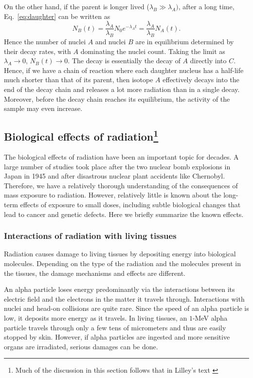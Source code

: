 \documentclass[nofootinbib,preprint,aps]{revtex4-1}
\begin{document}
        On the other hand, if the parent is longer lived
        ($\lambda_B \gg \lambda_A)$, after a long time, Eq.~\ref{eq:daughter} can be written as
        \begin{equation}
            N_B(t)=\frac{\lambda_A}{\lambda_B}N_0 e^{-\lambda_A t}=\frac{\lambda_A}{\lambda_B}N_A(t).
        \end{equation}
        Hence the number of nuclei $A$ and nuclei $B$ are in equilibrium determined by their decay rates, with
        $A$ dominating the nuclei count. Taking the limit as $\lambda_A \rightarrow 0$, $N_B(t)\rightarrow 0$.
        The decay is essentially the decay of $A$ directly into $C$. Hence, if we have a chain of reaction
        where each daughter nucleus has a half-life much shorter than that of its parent, then 
        isotope $A$ effectively decays into the end of the decay chain and releases a lot more radiation than
        in a single decay. Moreover, before the decay chain reaches its equilibrium, the activity of the sample
        may even increase.

        \subsection{Biological effects of radiation\footnote{Much of the discussion in this section follows that in
        Lilley's text \cite[chapt. 7]{l01}}}
        The biological effects of radiation have been an important topic for decades. A large
        number of studies took place after the two nuclear bomb explosions in Japan in 1945
        and after disastrous nuclear plant accidents like Chernobyl. Therefore, we have a relatively
        thorough understanding of the consequences of mass exposure to radiation. However, relatively
        little is known about the long-term effects of exposure to small doses, including subtle biological
        changes that lead to cancer and genetic defects. Here we briefly summarize the known effects.
        \subsubsection{Interactions of radiation with living tissues}
        \label{sec:interactions}
        Radiation causes damage to living tissues by depositing energy into biological molecules.
        Depending on the type of the radiation
        and the molecules present in the tissues, the damage mechanisms and effects are different.

        An alpha particle loses energy predominantly via the interactions between its electric
        field and the electrons in the matter it travels through. Interactions with nuclei and head-on collisions
        are quite rare. Since the speed of an alpha particle is low, it deposits more energy as it
        travels. In living tissues, an $1$-MeV alpha particle travels through only a few tens of micrometers and thus
        are easily stopped by skin. However, if alpha particles are ingested and more sensitive organs are irradiated,
        serious damages can be done.
\end{document}
